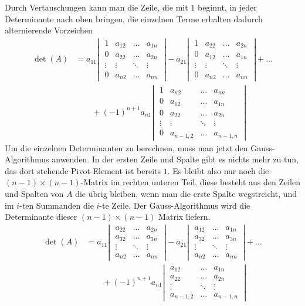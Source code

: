 Durch Vertauschungen kann man die Zeile, die mit $1$ beginnt, in jeder
Determinante nach oben bringen, die einzelnen Terme erhalten dadurch
alternierende Vorzeichen
\begin{align*}
\det(A)
&=
a_{11}
\left|\;
\begin{matrix}
1&a_{12}&\dots&a_{1n}\\
0&a_{22}&\dots&a_{2n}\\
\vdots&\vdots&\ddots&\vdots\\
0&a_{n2}&\dots&a_{nn}
\end{matrix}
\;\right|
-a_{21}
\left|\;
\begin{matrix}
1&a_{22}&\dots&a_{2n}\\
0&a_{12}&\dots&a_{1n}\\
\vdots&\vdots&\ddots&\vdots\\
0&a_{n2}&\dots&a_{nn}
\end{matrix}
\;\right|
+\dots
\\
&\qquad
+(-1)^{n+1}a_{n1}
\left|\;
\begin{matrix}
1&a_{n2}&\dots&a_{nn}\\
0&a_{12}&\dots&a_{1n}\\
0&a_{22}&\dots&a_{2n}\\
\vdots&\vdots&\ddots&\vdots\\
0&a_{n-1,2}&\dots&a_{n-1,n}
\end{matrix}
\;\right|
\end{align*}
Um die einzelnen Determinanten zu berechnen, muss man jetzt 
den Gauss-Algorithmus anwenden.
In der ersten Zeile und Spalte
gibt es nichts mehr zu tun, das dort stehende Pivot-Element ist
bereits $1$.
Es bleibt also nur noch die $(n-1)\times(n-1)$-Matrix
im rechten unteren Teil, diese besteht aus den Zeilen und Spalten
von $A$ die übrig bleiben, wenn man die erste Spalte wegstreicht,
und im $i$-ten Summanden die $i$-te Zeile.
Der Gauss-Algorithmus wird
die Determinante dieser $(n-1)\times(n-1)$ Matrix liefern.
\begin{align*}
\det(A)
&=
a_{11}
\left|\;
\begin{matrix}
a_{22}&\dots&a_{2n}\\
a_{32}&\dots&a_{3n}\\
\vdots&\ddots&\vdots\\
a_{n2}&\dots&a_{nn}
\end{matrix}
\;\right|
-a_{21}
\left|\;
\begin{matrix}
a_{12}&\dots&a_{1n}\\
a_{32}&\dots&a_{3n}\\
\vdots&\ddots&\vdots\\
a_{n2}&\dots&a_{nn}
\end{matrix}
\;\right|
+\dots
\\
&\qquad
+(-1)^{n+1}a_{n1}
\left|\;
\begin{matrix}
a_{12}&\dots&a_{1n}\\
a_{22}&\dots&a_{2n}\\
\vdots&\ddots&\vdots\\
a_{n-1,2}&\dots&a_{n-1,n}
\end{matrix}
\;\right|
\end{align*}
